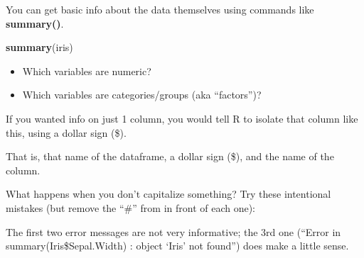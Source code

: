 \documentclass[]{book}
\newenvironment{Shaded}{\begin{snugshade}}{\end{snugshade}}
\newcommand{\KeywordTok}[1]{\textcolor[rgb]{0.13,0.29,0.53}{\textbf{#1}}}
\newcommand{\CommentTok}[1]{\textcolor[rgb]{0.56,0.35,0.01}{\textit{#1}}}
\newcommand{\OperatorTok}[1]{\textcolor[rgb]{0.81,0.36,0.00}{\textbf{#1}}}
\newcommand{\NormalTok}[1]{#1}
\providecommand{\tightlist}{%
  \setlength{\itemsep}{0pt}\setlength{\parskip}{0pt}}
\theoremstyle{definition}
\theoremstyle{definition}
\theoremstyle{definition}
\theoremstyle{remark}
\begin{document}
You can get basic info about the data themselves using commands like
\textbf{summary()}.

\begin{Shaded}
\begin{Highlighting}[]
\KeywordTok{summary}\NormalTok{(iris)}
\end{Highlighting}
\end{Shaded}

\begin{itemize}
\tightlist
\item
  Which variables are numeric?
\item
  Which variables are categories/groups (aka ``factors'')?
\end{itemize}

If you wanted info on just 1 column, you would tell R to isolate that
column like this, using a dollar sign (\$).

\begin{Shaded}
\end{Shaded}

That is, that name of the dataframe, a dollar sign (\$), and the name of
the column.

What happens when you don't capitalize something? Try these intentional
mistakes (but remove the ``\#'' from in front of each one):

\begin{Shaded}
\end{Shaded}

The first two error messages are not very informative; the 3rd one
(``Error in summary(Iris\$Sepal.Width) : object `Iris' not found'') does
make a little sense.
\end{document}

